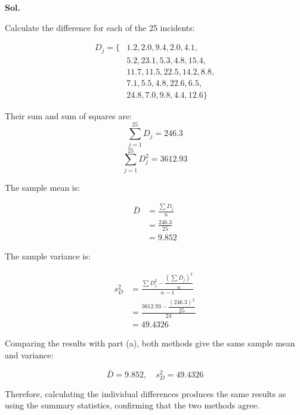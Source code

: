 \documentclass[12pt]{article}
\begin{document}
\vspace{0.2cm}

\textbf{Sol.}

\vspace{0.2cm}

Calculate the difference for each of the 25 incidents:

\vspace{0.2cm}

\begin{align*}
D_j = \{ &1.2, 2.0, 9.4, 2.0, 4.1, \\
& 5.2, 23.1, 5.3, 4.8, 15.4, \\
& 11.7, 11.5, 22.5, 14.2, 8.8, \\
& 7.1, 5.5, 4.8, 22.6, 6.5, \\
& 24.8, 7.0, 9.8, 4.4, 12.6 \}
\end{align*}

\vspace{0.2cm}

Their sum and sum of squares are:
\[
\sum_{j=1}^{25} D_j = 246.3
\]
\[
\sum_{j=1}^{25} D_j^2 = 3612.93
\]

\vspace{0.2cm}

The sample mean is:

\vspace{0.2cm}

\begin{align*}
\bar{D} &= \frac{\sum D_j}{n} \\
&= \frac{246.3}{25} \\
&= \boxed{9.852}
\end{align*}

\vspace{0.2cm}

The sample variance is:

\vspace{0.2cm}

\begin{align*}
s_D^2 &= \frac{\sum D_j^2 - \dfrac{(\sum D_j)^2}{n}}{n - 1} \\
&= \frac{3612.93 - \dfrac{(246.3)^2}{25}}{24} \\
&= \boxed{49.4326}
\end{align*}

\vspace{0.2cm}

Comparing the results with part (a), both methods give the same sample mean and variance:

\vspace{0.2cm}

\[
\boxed{\bar{D} = 9.852, \quad s_D^2 = 49.4326}
\]

\vspace{0.2cm}

Therefore, calculating the individual differences produces the same results as using the summary statistics, confirming that the two methods agree.
\end{document}
